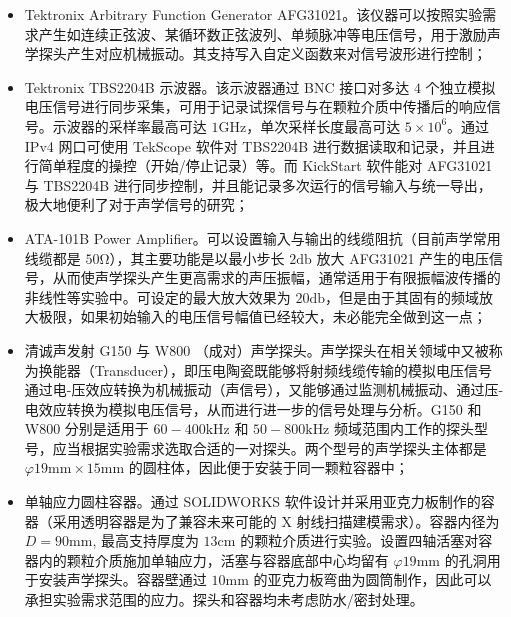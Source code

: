 \begin{itemize}
  \item Tektronix Arbitrary Function Generator AFG31021。该仪器可以按照实验需求产生如连续正弦波、某循环数正弦波列、单频脉冲等电压信号，用于激励声学探头产生对应机械振动。其支持写入自定义函数来对信号波形进行控制；
  \item Tektronix TBS2204B 示波器。该示波器通过 BNC 接口对多达 $4$ 个独立模拟电压信号进行同步采集，可用于记录试探信号与在颗粒介质中传播后的响应信号。示波器的采样率最高可达 $1\unit{\giga\hertz}$，单次采样长度最高可达 $5\times 10^{6}$。通过 IPv4 网口可使用 TekScope 软件对 TBS2204B 进行数据读取和记录，并且进行简单程度的操控（开始/停止记录）等。而 KickStart 软件能对 AFG31021 与 TBS2204B 进行同步控制，并且能记录多次运行的信号输入与统一导出，极大地便利了对于声学信号的研究；
  \item ATA-101B Power Amplifier。可以设置输入与输出的线缆阻抗（目前声学常用线缆都是 $50\unit{\ohm}$），其主要功能是以最小步长 $2\unit{\decibel}$ 放大 AFG31021 产生的电压信号，从而使声学探头产生更高需求的声压振幅，通常适用于有限振幅波传播的非线性等实验中。可设定的最大放大效果为 $20\unit{\decibel}$，但是由于其固有的频域放大极限，如果初始输入的电压信号幅值已经较大，未必能完全做到这一点；
  \item 清诚声发射 G150 与 W800 （成对）声学探头。声学探头在相关领域中又被称为换能器（Transducer），即压电陶瓷既能够将射频线缆传输的模拟电压信号通过电-压效应转换为机械振动（声信号），又能够通过监测机械振动、通过压-电效应转换为模拟电压信号，从而进行进一步的信号处理与分析。G150 和 W800 分别是适用于 $60-400\unit{\kilo\Hz}$ 和 $50-800\unit{\kilo\hertz}$ 频域范围内工作的探头型号，应当根据实验需求选取合适的一对探头。两个型号的声学探头主体都是 $\varphi 19\unit{\milli\meter}\times 15\unit{\milli\meter}$ 的圆柱体，因此便于安装于同一颗粒容器中；
  \item 单轴应力圆柱容器。通过 SOLIDWORKS 软件设计并采用亚克力板制作的容器（采用透明容器是为了兼容未来可能的 X 射线扫描建模需求）。容器内径为 $D = 90\unit{\milli\meter}$, 最高支持厚度为 $13\unit{\centi\meter}$ 的颗粒介质进行实验。设置四轴活塞对容器内的颗粒介质施加单轴应力，活塞与容器底部中心均留有 $\varphi 19\unit{\milli\meter}$ 的孔洞用于安装声学探头。容器壁通过 $10\unit{\milli\meter}$ 的亚克力板弯曲为圆筒制作，因此可以承担实验需求范围的应力。探头和容器均未考虑防水/密封处理。
\end{itemize}



